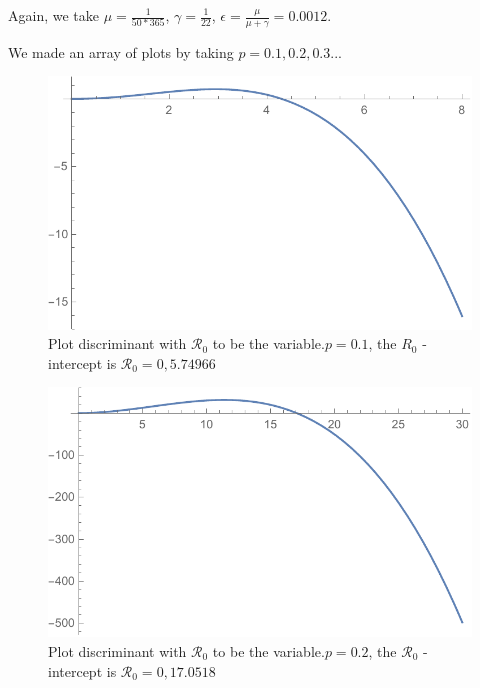 \documentclass[12pt]{article}
\newcommand{\R}{\mathcal{R}}
\begin{document}
Again, we take $\mu=\frac{1}{50*365}$, $\gamma=\frac{1}{22}$, $\epsilon=\frac{\mu}{\mu+\gamma}=0.0012$.

We made an array of plots by taking $p=0.1,0.2,0.3...$

\begin{figure}[H]
  \caption{Plot discriminant with $\R_0$ to be the variable.$p=0.1$, the $R_0$ -intercept is $\R_0 = 0, 5.74966$}
  \centering
  \includegraphics[width=1.1\textwidth]{Figures/Plot_R_0_p_0_1.pdf}
\end{figure}

\begin{figure}[H]
  \caption{Plot discriminant with $\R_0$ to be the variable.$p=0.2$, the $\R_0$ -intercept is $\R_0 = 0, 17.0518$}
  \centering
  \includegraphics[width=1.1\textwidth]{Figures/Plot_R_0_p_0_2.pdf}
\end{figure}
\end{document}
